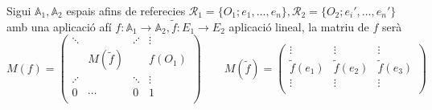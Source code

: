 Sigui $\mathbb{A}_1,\mathbb{A}_2$ espais afins de referecies $\mathcal{R}_1=\{O_1;e_1,\dotsc ,e_n\},\mathcal{R}_2=\{O_2;e_i',\dotsc ,e_n'\}$ amb una aplicació afí $f:\mathbb{A}_1\to\mathbb{A}_2,\widetilde{f}:E_1\to E_2$ aplicació lineal, la matriu de $f$ serà
\[M(f)=\left(\begin{array}{ccc|c}
	\ddots&&\iddots&\vdots\\
	&M(\widetilde{f})&&f(O_1)\\
	\iddots&&\ddots&\vdots\\ \hline
	0&\cdots&0&1\\
\end{array}\right)\hspace{2em}M(\widetilde{f})=\left(\begin{array}{c|c|c}
	\vdots&\vdots&\vdots\\
	\widetilde{f}(e_1)&\widetilde{f}(e_2)&\widetilde{f}(e_3)\\
	\vdots&\vdots&\vdots\\
\end{array}\right)\]

